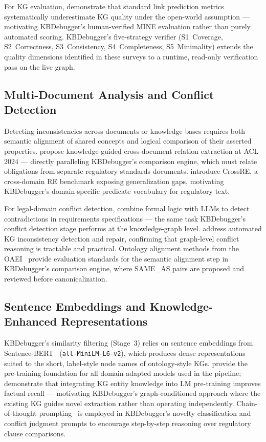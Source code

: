 For KG evaluation, \citet{chen2022openworld} demonstrate that standard link prediction
metrics systematically underestimate KG quality under the open-world assumption —
motivating KBDebugger's human-verified MINE evaluation rather than purely automated scoring.
KBDebugger's five-strategy verifier (S1~Coverage, S2~Correctness, S3~Consistency,
S4~Completeness, S5~Minimality) extends the quality dimensions identified in these surveys
to a runtime, read-only verification pass on the live graph.

\subsection{Multi-Document Analysis and Conflict Detection}

Detecting inconsistencies across documents or knowledge bases requires both semantic
alignment of shared concepts and logical comparison of their asserted properties.
\citet{wang2024crossdoc} propose knowledge-guided cross-document relation extraction at
ACL 2024 — directly paralleling KBDebugger's comparison engine, which must relate
obligations from separate regulatory standards documents.
\citet{bassignana2022crossre} introduce CrossRE, a cross-domain RE benchmark exposing
generalization gaps, motivating KBDebugger's domain-specific predicate vocabulary for
regulatory text.

For legal-domain conflict detection, \citet{anon2024reqcontra} combine formal logic with
LLMs to detect contradictions in requirements specifications — the same task KBDebugger's
conflict detection stage performs at the knowledge-graph level.
\citet{akasiadis2025inconsistency} address automated KG inconsistency detection and repair,
confirming that graph-level conflict reasoning is tractable and practical.
Ontology alignment methods from the OAEI~\citep{oaei2024} provide evaluation standards
for the semantic alignment step in KBDebugger's comparison engine, where SAME\_AS pairs
are proposed and reviewed before canonicalization.

\subsection{Sentence Embeddings and Knowledge-Enhanced Representations}

KBDebugger's similarity filtering (Stage~3) relies on sentence embeddings from
Sentence-BERT~\citep{reimers2019sentencebert} (\texttt{all-MiniLM-L6-v2}), which produces
dense representations suited to the short, label-style node names of ontology-style KGs.
\citet{devlin2019bert} provide the pre-training foundation for all domain-adapted models
used in the pipeline; \citet{sun2019ernie} demonstrate that integrating KG entity
knowledge into LM pre-training improves factual recall — motivating KBDebugger's
graph-conditioned approach where the existing KG guides novel extraction rather than
operating independently.
Chain-of-thought prompting~\citep{wei2022cot} is employed in KBDebugger's novelty
classification and conflict judgment prompts to encourage step-by-step reasoning over
regulatory clause comparisons.
